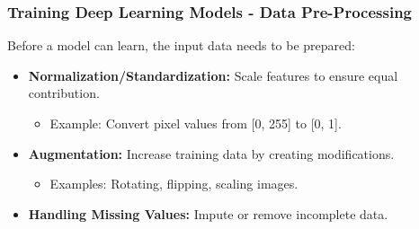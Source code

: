 \documentclass{beamer}
\begin{document}
\begin{frame}[fragile]
    \frametitle{Training Deep Learning Models - Data Pre-Processing}
    Before a model can learn, the input data needs to be prepared:
    \begin{itemize}
        \item \textbf{Normalization/Standardization:} Scale features to ensure equal contribution.
        \begin{itemize}
            \item Example: Convert pixel values from [0, 255] to [0, 1].
        \end{itemize}
        
        \item \textbf{Augmentation:} Increase training data by creating modifications.
        \begin{itemize}
            \item Examples: Rotating, flipping, scaling images.
        \end{itemize}
        
        \item \textbf{Handling Missing Values:} Impute or remove incomplete data.
    \end{itemize}
\end{frame}
\end{document}

